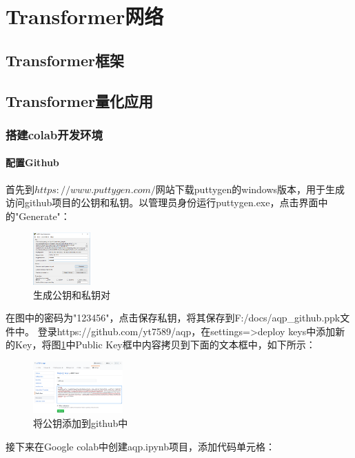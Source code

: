 \documentclass{article}
\begin{document}
\section{Transformer网络}
\subsection{Transformer框架}
\subsection{Transformer量化应用}
\subsubsection{搭建colab开发环境}
\paragraph{配置Github}
首先到$https://www.puttygen.com/$网站下载puttygen的windows版本，用于生成访问github项目的公钥和私钥。以管理员身份运行puttygen.exe，点击界面中的"Generate"：
\begin{figure}[H]
	\caption{生成公钥和私钥对}
	\label{f000040}
	\centering
	\includegraphics[height=2cm]{images/f000040}
\end{figure}
在图中的密码为"123456"，点击保存私钥，将其保存到F:/docs/aqp\_github.ppk文件中。\newline
登录https://github.com/yt7589/aqp，在settings=>deploy keys中添加新的Key，将图\ref{f000040}中Public Key框中内容拷贝到下面的文本框中，如下所示：
\begin{figure}[H]
	\caption{将公钥添加到github中}
	\label{f000041}
	\centering
	\includegraphics[height=2cm]{images/f000041}
\end{figure}
接下来在Google colab中创建aqp.ipynb项目，添加代码单元格：
\end{document}
